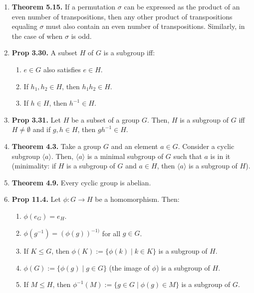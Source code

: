 \documentclass[12pt]{article}
\theoremstyle{definition}
\theoremstyle{named}
\begin{document}
\begin{enumerate}
	\item \textbf{Theorem 5.15. } If a permutation $\sigma$ can be expressed as the product of an even number of transpositions, then any other product of transpositions equaling $\sigma$ must also contain an even number of transpositions. Similarly, in the case of when $\sigma$ is odd. 
	\item \textbf{Prop 3.30. } A subset $H$ of $G$ is a subgroup iff: 
	\begin{enumerate}
		\item $e \in G$ also satisfies $e \in H$. 
		\item If $h_1,h_2 \in H$, then $h_1h_2 \in H$. 
		\item If $h \in H$, then $h^{-1} \in H$. 
	\end{enumerate}
	\item \textbf{Prop 3.31. } Let $H$ be a subset of a group $G$. Then, $H$ is a subgroup of $G$ iff $H \neq \emptyset$ and if $g,h \in H$, then $gh^{-1} \in H$. 
	\item \textbf{Theorem 4.3. } Take a group $G$ and an element $a \in G$. Consider a cyclic subgroup $\langle a \rangle$. Then, $\langle a \rangle$ is a minimal subgroup of $G$ such that $a$ is in it (minimality: if $H$ is a subgroup of $G$ and $a \in H$, then $\langle a \rangle$ is a subgroup of $H$). 
	\item \textbf{Theorem 4.9. } Every cyclic group is abelian. 
	\item \textbf{Prop 11.4. } Let $\phi: G \to H$ be a homomorphism. Then: 
	\begin{enumerate}
		\item $\phi(e_G) = e_H$. 
		\item $\phi(g^{-1}) = (\phi(g))^{-1)}$ for all $g \in G$. 
		\item If $K \leq G$, then $\phi(K) := \{\phi(k) \mid k \in K\}$ is a subgroup of $H$. 
		\item $\phi(G) := \{\phi(g) \mid g \in G\}$ (the image of $\phi$) is a subgroup of $H$. 
		\item If $M \leq H$, then $\phi^{-1}(M) := \{g \in G \mid \phi(g) \in M\}$ is a subgroup of $G$. 
	\end{enumerate} 
\end{enumerate}
\end{document}
